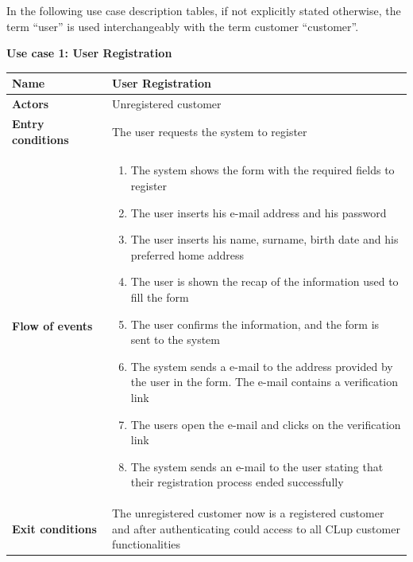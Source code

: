 \medskip
\clearpage
In the following use case description tables, if not explicitly stated otherwise, the term ``user'' is used interchangeably with the term customer ``customer''.
\medskip

\textbf{Use case 1: User Registration}
\smallskip

\begin{longtable}{p{0.25\linewidth}p{0.75\linewidth}}
    \toprule
    \textbf{Name}             & \textbf{User Registration}                                                                                                        \\
    \midrule
    \textbf{Actors}           & Unregistered customer                                                                                                             \\
    \midrule
    \textbf{Entry conditions} & The user requests the system to register                                                                                          \\
    \midrule
    \textbf{Flow of events}   &
    \begin{enumerate}
        \item The system shows the form with the required fields to register
        \item The user inserts his e-mail address and his password
        \item The user inserts his name, surname, birth date and his preferred home address
        \item The user is shown the recap of the information used to fill the form
        \item The user confirms the information, and the form is sent to the system
        \item The system sends a e-mail to the address provided by the user in the form. The e-mail contains a verification link
        \item The users open the e-mail and clicks on the verification link
        \item The system sends an e-mail to the user stating that their registration process ended successfully
    \end{enumerate}                                                                                                                                     \\
    \midrule
    \textbf{Exit conditions}  & The unregistered customer now is a registered customer and after authenticating could access to all CLup customer functionalities \\

\end{longtable}

